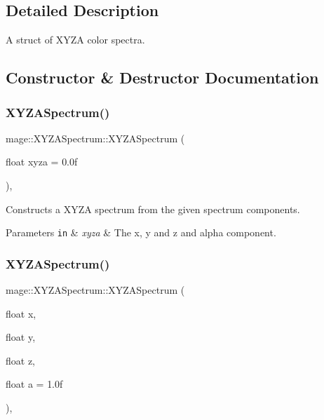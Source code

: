 \subsection{Detailed Description}
A struct of X\+Y\+ZA color spectra. 

\subsection{Constructor \& Destructor Documentation}
\hypertarget{structmage_1_1_x_y_z_a_spectrum_a121266a2b3f40eae8fe6c157086480f5}{}\label{structmage_1_1_x_y_z_a_spectrum_a121266a2b3f40eae8fe6c157086480f5} 
\subsubsection{\texorpdfstring{X\+Y\+Z\+A\+Spectrum()}{XYZASpectrum()}\hspace{0.1cm}{\footnotesize\ttfamily [1/9]}}
{\footnotesize\ttfamily mage\+::\+X\+Y\+Z\+A\+Spectrum\+::\+X\+Y\+Z\+A\+Spectrum (\begin{DoxyParamCaption}\item[{float}]{xyza = {\ttfamily 0.0f} }\end{DoxyParamCaption})\hspace{0.3cm}{\ttfamily [explicit]}, {\ttfamily [noexcept]}}

Constructs a X\+Y\+ZA spectrum from the given spectrum components.


\begin{DoxyParams}[1]{Parameters}
\mbox{\tt in}  & {\em xyza} & The x, y and z and alpha component. \\
\hline
\end{DoxyParams}
\hypertarget{structmage_1_1_x_y_z_a_spectrum_ac50cc3275b859f08b5751f8485a3cf0d}{}\label{structmage_1_1_x_y_z_a_spectrum_ac50cc3275b859f08b5751f8485a3cf0d} 
\subsubsection{\texorpdfstring{X\+Y\+Z\+A\+Spectrum()}{XYZASpectrum()}\hspace{0.1cm}{\footnotesize\ttfamily [2/9]}}
{\footnotesize\ttfamily mage\+::\+X\+Y\+Z\+A\+Spectrum\+::\+X\+Y\+Z\+A\+Spectrum (\begin{DoxyParamCaption}\item[{float}]{x,  }\item[{float}]{y,  }\item[{float}]{z,  }\item[{float}]{a = {\ttfamily 1.0f} }\end{DoxyParamCaption})\hspace{0.3cm}{\ttfamily [explicit]}, {\ttfamily [noexcept]}}

